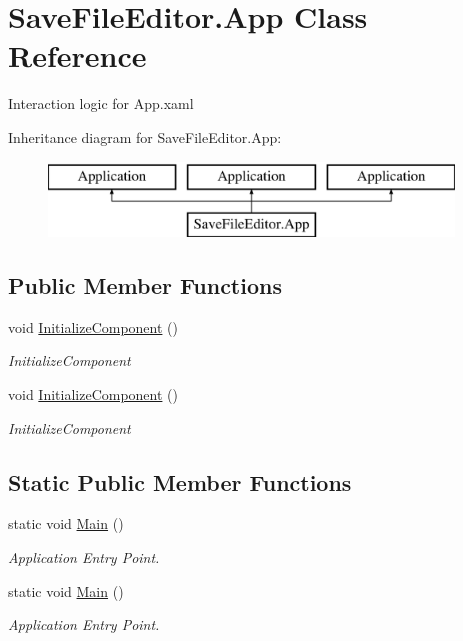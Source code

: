 \hypertarget{class_save_file_editor_1_1_app}{}\section{Save\+File\+Editor.\+App Class Reference}
\label{class_save_file_editor_1_1_app}


Interaction logic for App.\+xaml  


Inheritance diagram for Save\+File\+Editor.\+App\+:\begin{figure}[H]
\begin{center}
\leavevmode
\includegraphics[height=2.000000cm]{class_save_file_editor_1_1_app}
\end{center}
\end{figure}
\subsection*{Public Member Functions}
\begin{DoxyCompactItemize}
\item 
void \hyperlink{class_save_file_editor_1_1_app_ae73773934c597bd92944c80ffb814b5b}{Initialize\+Component} ()
\begin{DoxyCompactList}\small\item\em Initialize\+Component \end{DoxyCompactList}\item 
void \hyperlink{class_save_file_editor_1_1_app_ae73773934c597bd92944c80ffb814b5b}{Initialize\+Component} ()
\begin{DoxyCompactList}\small\item\em Initialize\+Component \end{DoxyCompactList}\end{DoxyCompactItemize}
\subsection*{Static Public Member Functions}
\begin{DoxyCompactItemize}
\item 
static void \hyperlink{class_save_file_editor_1_1_app_a32eb74d1e3b65bcfa7faa6dcda88fddb}{Main} ()
\begin{DoxyCompactList}\small\item\em Application Entry Point. \end{DoxyCompactList}\item 
static void \hyperlink{class_save_file_editor_1_1_app_a32eb74d1e3b65bcfa7faa6dcda88fddb}{Main} ()
\begin{DoxyCompactList}\small\item\em Application Entry Point. \end{DoxyCompactList}\end{DoxyCompactItemize}


